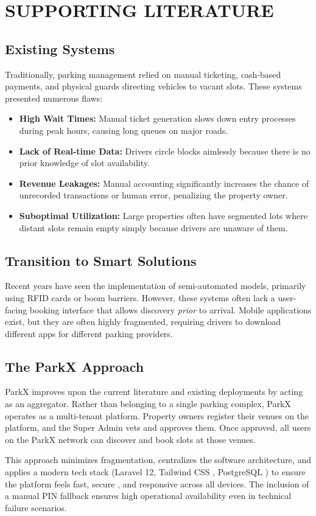 \chapter{SUPPORTING LITERATURE}

\section{Existing Systems}
Traditionally, parking management relied on manual ticketing, cash-based payments, and physical guards directing vehicles to vacant slots. These systems presented numerous flaws:
\begin{itemize}
    \item \textbf{High Wait Times:} Manual ticket generation slows down entry processes during peak hours, causing long queues on major roads.
    \item \textbf{Lack of Real-time Data:} Drivers circle blocks aimlessly because there is no prior knowledge of slot availability.
    \item \textbf{Revenue Leakages:} Manual accounting significantly increases the chance of unrecorded transactions or human error, penalizing the property owner.
    \item \textbf{Suboptimal Utilization:} Large properties often have segmented lots where distant slots remain empty simply because drivers are unaware of them.
\end{itemize}

\section{Transition to Smart Solutions}
Recent years have seen the implementation of semi-automated models, primarily using RFID cards or boom barriers. However, these systems often lack a user-facing booking interface that allows discovery \textit{prior} to arrival. Mobile applications exist, but they are often highly fragmented, requiring drivers to download different apps for different parking providers.

\section{The ParkX Approach}
ParkX improves upon the current literature and existing deployments by acting as an aggregator. Rather than belonging to a single parking complex, ParkX operates as a multi-tenant platform. Property owners register their venues on the platform, and the Super Admin vets and approves them. Once approved, all users on the ParkX network can discover and book slots at those venues. 

This approach minimizes fragmentation, centralizes the software architecture, and applies a modern tech stack (Laravel 12, Tailwind CSS \cite{tailwindcss}, PostgreSQL \cite{postgresql}) to ensure the platform feels fast, secure \cite{laravel_docs}, and responsive across all devices. The inclusion of a manual PIN fallback ensures high operational availability even in technical failure scenarios.
